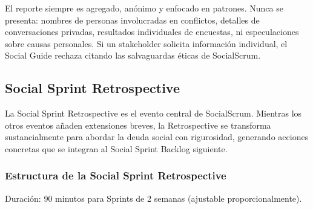El reporte siempre es agregado, anónimo y enfocado en patrones. Nunca se presenta: nombres de personas involucradas en conflictos, detalles de conversaciones privadas, resultados individuales de encuestas, ni especulaciones sobre causas personales. Si un stakeholder solicita información individual, el Social Guide rechaza citando las salvaguardas éticas de SocialScrum.

\subsection{Social Sprint Retrospective}

La Social Sprint Retrospective es el evento central de SocialScrum. Mientras los otros eventos añaden extensiones breves, la Retrospective se transforma sustancialmente para abordar la deuda social con rigurosidad, generando acciones concretas que se integran al Social Sprint Backlog siguiente.

\subsubsection{Estructura de la Social Sprint Retrospective}

Duración: 90 minutos para Sprints de 2 semanas (ajustable proporcionalmente).

